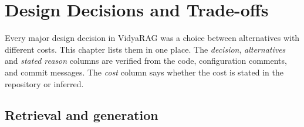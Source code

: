 \chapter{Design Decisions and Trade-offs}
\label{ch:tradeoffs}

Every major design decision in VidyaRAG was a choice between alternatives with different costs. This chapter lists them in one place. The \emph{decision}, \emph{alternatives} and \emph{stated reason} columns are verified from the code, configuration comments,  and commit messages. The \emph{cost} column says whether the cost is stated in the repository or inferred.

\section{Retrieval and generation}

